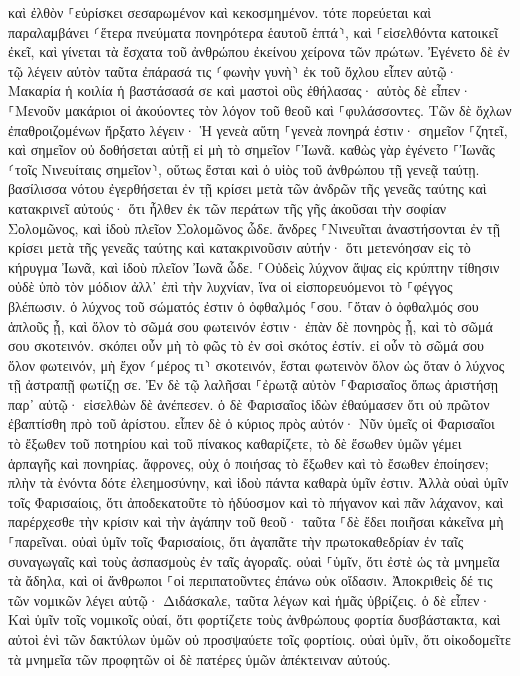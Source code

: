 \documentclass[twoside, 9pt]{extreport}
\begin{document}
καὶ ἐλθὸν ⸀εὑρίσκει σεσαρωμένον καὶ κεκοσμημένον. 
τότε πορεύεται καὶ παραλαμβάνει ⸂ἕτερα πνεύματα πονηρότερα ἑαυτοῦ ἑπτά⸃, καὶ ⸀εἰσελθόντα κατοικεῖ ἐκεῖ, καὶ γίνεται τὰ ἔσχατα τοῦ ἀνθρώπου ἐκείνου χείρονα τῶν πρώτων. 
Ἐγένετο δὲ ἐν τῷ λέγειν αὐτὸν ταῦτα ἐπάρασά τις ⸂φωνὴν γυνὴ⸃ ἐκ τοῦ ὄχλου εἶπεν αὐτῷ· Μακαρία ἡ κοιλία ἡ βαστάσασά σε καὶ μαστοὶ οὓς ἐθήλασας· 
αὐτὸς δὲ εἶπεν· ⸀Μενοῦν μακάριοι οἱ ἀκούοντες τὸν λόγον τοῦ θεοῦ καὶ ⸀φυλάσσοντες. 
Τῶν δὲ ὄχλων ἐπαθροιζομένων ἤρξατο λέγειν· Ἡ γενεὰ αὕτη ⸀γενεὰ πονηρά ἐστιν· σημεῖον ⸀ζητεῖ, καὶ σημεῖον οὐ δοθήσεται αὐτῇ εἰ μὴ τὸ σημεῖον ⸀Ἰωνᾶ. 
καθὼς γὰρ ἐγένετο ⸀Ἰωνᾶς ⸂τοῖς Νινευίταις σημεῖον⸃, οὕτως ἔσται καὶ ὁ υἱὸς τοῦ ἀνθρώπου τῇ γενεᾷ ταύτῃ. 
βασίλισσα νότου ἐγερθήσεται ἐν τῇ κρίσει μετὰ τῶν ἀνδρῶν τῆς γενεᾶς ταύτης καὶ κατακρινεῖ αὐτούς· ὅτι ἦλθεν ἐκ τῶν περάτων τῆς γῆς ἀκοῦσαι τὴν σοφίαν Σολομῶνος, καὶ ἰδοὺ πλεῖον Σολομῶνος ὧδε. 
ἄνδρες ⸀Νινευῖται ἀναστήσονται ἐν τῇ κρίσει μετὰ τῆς γενεᾶς ταύτης καὶ κατακρινοῦσιν αὐτήν· ὅτι μετενόησαν εἰς τὸ κήρυγμα Ἰωνᾶ, καὶ ἰδοὺ πλεῖον Ἰωνᾶ ὧδε. 
⸀Οὐδεὶς λύχνον ἅψας εἰς κρύπτην τίθησιν οὐδὲ ὑπὸ τὸν μόδιον ἀλλ᾽ ἐπὶ τὴν λυχνίαν, ἵνα οἱ εἰσπορευόμενοι τὸ ⸀φέγγος βλέπωσιν. 
ὁ λύχνος τοῦ σώματός ἐστιν ὁ ὀφθαλμός ⸀σου. ⸀ὅταν ὁ ὀφθαλμός σου ἁπλοῦς ᾖ, καὶ ὅλον τὸ σῶμά σου φωτεινόν ἐστιν· ἐπὰν δὲ πονηρὸς ᾖ, καὶ τὸ σῶμά σου σκοτεινόν. 
σκόπει οὖν μὴ τὸ φῶς τὸ ἐν σοὶ σκότος ἐστίν. 
εἰ οὖν τὸ σῶμά σου ὅλον φωτεινόν, μὴ ἔχον ⸂μέρος τι⸃ σκοτεινόν, ἔσται φωτεινὸν ὅλον ὡς ὅταν ὁ λύχνος τῇ ἀστραπῇ φωτίζῃ σε. 
Ἐν δὲ τῷ λαλῆσαι ⸀ἐρωτᾷ αὐτὸν ⸀Φαρισαῖος ὅπως ἀριστήσῃ παρ᾽ αὐτῷ· εἰσελθὼν δὲ ἀνέπεσεν. 
ὁ δὲ Φαρισαῖος ἰδὼν ἐθαύμασεν ὅτι οὐ πρῶτον ἐβαπτίσθη πρὸ τοῦ ἀρίστου. 
εἶπεν δὲ ὁ κύριος πρὸς αὐτόν· Νῦν ὑμεῖς οἱ Φαρισαῖοι τὸ ἔξωθεν τοῦ ποτηρίου καὶ τοῦ πίνακος καθαρίζετε, τὸ δὲ ἔσωθεν ὑμῶν γέμει ἁρπαγῆς καὶ πονηρίας. 
ἄφρονες, οὐχ ὁ ποιήσας τὸ ἔξωθεν καὶ τὸ ἔσωθεν ἐποίησεν; 
πλὴν τὰ ἐνόντα δότε ἐλεημοσύνην, καὶ ἰδοὺ πάντα καθαρὰ ὑμῖν ἐστιν. 
Ἀλλὰ οὐαὶ ὑμῖν τοῖς Φαρισαίοις, ὅτι ἀποδεκατοῦτε τὸ ἡδύοσμον καὶ τὸ πήγανον καὶ πᾶν λάχανον, καὶ παρέρχεσθε τὴν κρίσιν καὶ τὴν ἀγάπην τοῦ θεοῦ· ταῦτα ⸀δὲ ἔδει ποιῆσαι κἀκεῖνα μὴ ⸀παρεῖναι. 
οὐαὶ ὑμῖν τοῖς Φαρισαίοις, ὅτι ἀγαπᾶτε τὴν πρωτοκαθεδρίαν ἐν ταῖς συναγωγαῖς καὶ τοὺς ἀσπασμοὺς ἐν ταῖς ἀγοραῖς. 
οὐαὶ ⸀ὑμῖν, ὅτι ἐστὲ ὡς τὰ μνημεῖα τὰ ἄδηλα, καὶ οἱ ἄνθρωποι ⸀οἱ περιπατοῦντες ἐπάνω οὐκ οἴδασιν. 
Ἀποκριθεὶς δέ τις τῶν νομικῶν λέγει αὐτῷ· Διδάσκαλε, ταῦτα λέγων καὶ ἡμᾶς ὑβρίζεις. 
ὁ δὲ εἶπεν· Καὶ ὑμῖν τοῖς νομικοῖς οὐαί, ὅτι φορτίζετε τοὺς ἀνθρώπους φορτία δυσβάστακτα, καὶ αὐτοὶ ἑνὶ τῶν δακτύλων ὑμῶν οὐ προσψαύετε τοῖς φορτίοις. 
οὐαὶ ὑμῖν, ὅτι οἰκοδομεῖτε τὰ μνημεῖα τῶν προφητῶν οἱ δὲ πατέρες ὑμῶν ἀπέκτειναν αὐτούς. 
\end{document}
